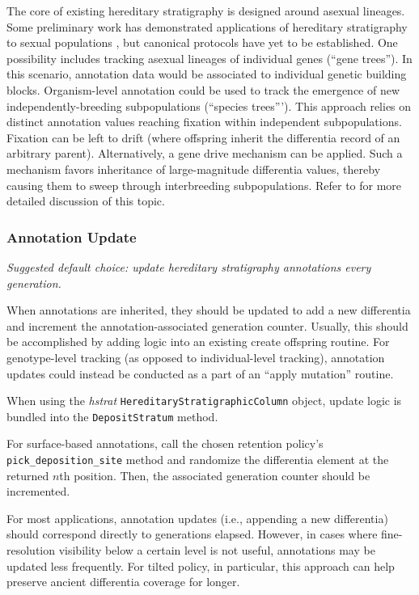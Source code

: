 The core of existing hereditary stratigraphy is designed around asexual lineages.
Some preliminary work has demonstrated applications of hereditary stratigraphy to sexual populations \citep{moreno2024methods}, but canonical protocols have yet to be established.
One possibility includes tracking asexual lineages of individual genes (``gene trees'').
In this scenario, annotation data would be associated to individual genetic building blocks.
Organism-level annotation could be used to track the emergence of new independently-breeding subpopulations (``species trees''').
This approach relies on distinct annotation values reaching fixation within independent subpopulations.
Fixation can be left to drift (where offspring inherit the differentia record of an arbitrary parent).
Alternatively, a gene drive mechanism can be applied.
Such a mechanism favors inheritance of large-magnitude differentia values, thereby causing them to sweep through interbreeding subpopulations.
Refer to \citet{moreno2024methods} for more detailed discussion of this topic.

\subsubsection{Annotation Update}
\textit{Suggested default choice: update hereditary stratigraphy annotations every generation.}

When annotations are inherited, they should be updated to add a new differentia and increment the annotation-associated generation counter.
Usually, this should be accomplished by adding logic into an existing create offspring routine.
For genotype-level tracking (as opposed to individual-level tracking), annotation updates could instead be conducted as a part of an ``apply mutation'' routine.

When using the \textit{hstrat} \texttt{HereditaryStratigraphicColumn} object, update logic is bundled into the \texttt{DepositStratum} method.

For surface-based annotations, call the chosen retention policy's \texttt{pick\_deposition\_site} method and randomize the differentia element at the returned $n$th position.
Then, the associated generation counter should be incremented.

For most applications, annotation updates (i.e., appending a new differentia) should correspond directly to generations elapsed.
However, in cases where fine-resolution visibility below a certain level is not useful, annotations may be updated less frequently.
For tilted policy, in particular, this approach can help preserve ancient differentia coverage for longer.

